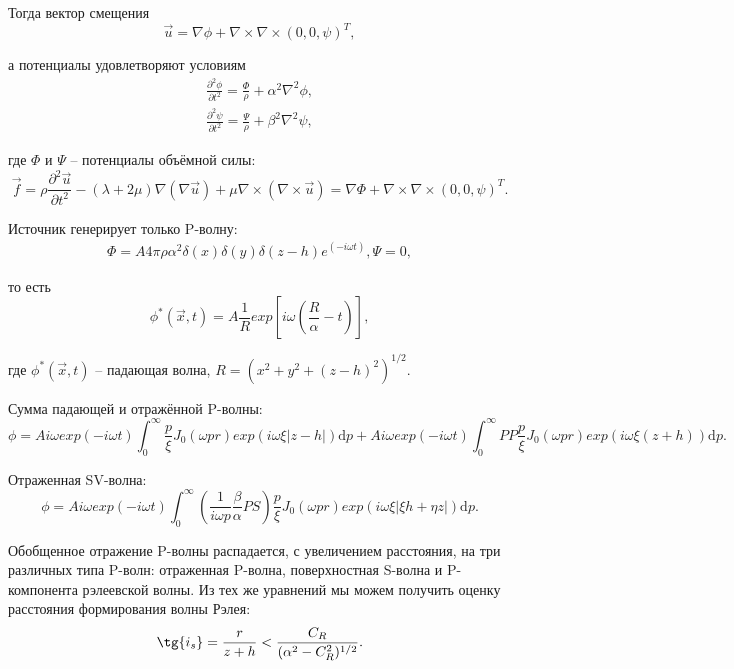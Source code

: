 Тогда вектор смещения
\begin{equation}
\vec{u} = \nabla \phi + \nabla \times \nabla \times (0, 0, \psi)^T,
\end{equation}

а потенциалы удовлетворяют условиям
\begin{eqnarray}
\frac{\partial^2 \phi}{\partial t^2} = \frac{\Phi}{\rho} + \alpha^2 \nabla^2 \phi, \\
\frac{\partial^2 \psi}{\partial t^2} = \frac{\Psi}{\rho} + \beta^2 \nabla^2 \psi,
\end{eqnarray}

где $\Phi$ и $\Psi$ -- потенциалы объёмной силы:
\begin{equation}
\vec{f} = \rho \frac{\partial^2 \vec{u}}{\partial t^2} - (\lambda + 2\mu)\nabla(\nabla\vec{u}) + \mu \nabla \times (\nabla \times \vec{u} ) = \nabla \Phi + \nabla \times \nabla \times (0, 0, \psi)^T.
\end{equation}

Источник генерирует только P-волну:
\begin{eqnarray}
\Phi = A 4\pi \rho \alpha^2 \delta(x)\delta(y)\delta(z-h)e^(-i \omega t),
\Psi = 0,
\end{eqnarray}

то есть
\begin{equation}
\phi^*(\vec{x}, t) = A \frac{1}{R} exp[i\omega (\frac{R}{\alpha} - t)],
\end{equation}

где $\phi^*(\vec{x}, t)$ -- падающая волна, $R = (x^2 + y^2 + (z-h)^2)^{1/2}$.

Сумма падающей и отражённой P-волны:
\begin{equation}
\phi = A i \omega exp(-i \omega t) \int_0^\infty { \frac{p}{\xi}J_0(\omega pr)exp(i \omega \xi |z - h|) \mathrm{d}p}
	+ A i \omega exp(-i \omega t) \int_0^\infty { PP \frac{p}{\xi}J_0(\omega pr)exp(i \omega \xi (z + h)) \mathrm{d}p}.
\end{equation}

Отраженная SV-волна:
\begin{equation}
\phi = A i \omega exp(-i \omega t) \int_0^\infty { (\frac{1}{i \omega p} \frac{\beta}{\alpha} PS) \frac{p}{\xi}J_0(\omega pr)exp(i \omega \xi |\xi h + \eta z|) \mathrm{d}p}.
\end{equation}

Обобщенное отражение P-волны распадается, с увеличением расстояния, на три различных типа P-волн: отраженная P-волна, поверхностная S-волна и P-компонента рэлеевской волны. Из тех же уравнений мы можем получить оценку расстояния формирования волны Рэлея:
\begin{equation}
\tg{i_s} = \frac{r}{z+h} < \frac{C_R}{(\alpha^2 - C_R^2)^{1/2}}.
\end{equation}

